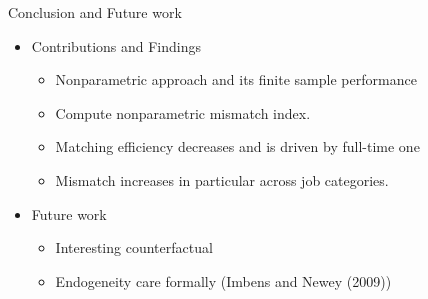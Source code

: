 \documentclass[aspectratio=169]{beamer}
\begin{document}
\begin{frame}{Conclusion and Future work}
    \begin{itemize}
      \item Contributions and Findings
      \begin{itemize}
          \item Nonparametric approach and its finite sample performance
          \item Compute nonparametric mismatch index.
          \item Matching efficiency decreases and is driven by full-time one
          \item Mismatch increases in particular across job categories.
      \end{itemize}
      \item Future work
      \begin{itemize}
          \item Interesting counterfactual
          \item Endogeneity care formally (Imbens and Newey (2009))
      \end{itemize}
    \end{itemize}
\end{frame}
\end{document}
